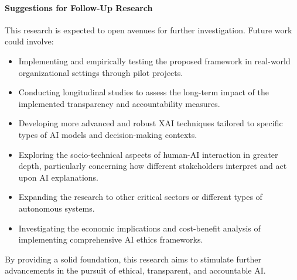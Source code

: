 \documentclass[english]{hogent-article}
\begin{document}
\paragraph{Suggestions for Follow-Up Research}
This research is expected to open avenues for further investigation. Future work could involve:
\begin{itemize}
    \item Implementing and empirically testing the proposed framework in real-world organizational settings through pilot projects.
    \item Conducting longitudinal studies to assess the long-term impact of the implemented transparency and accountability measures.
    \item Developing more advanced and robust XAI techniques tailored to specific types of AI models and decision-making contexts.
    \item Exploring the socio-technical aspects of human-AI interaction in greater depth, particularly concerning how different stakeholders interpret and act upon AI explanations.
    \item Expanding the research to other critical sectors or different types of autonomous systems.
    \item Investigating the economic implications and cost-benefit analysis of implementing comprehensive AI ethics frameworks.
\end{itemize}
By providing a solid foundation, this research aims to stimulate further advancements in the pursuit of ethical, transparent, and accountable AI.


\printbibliography[heading=bibintoc]
\end{document}
